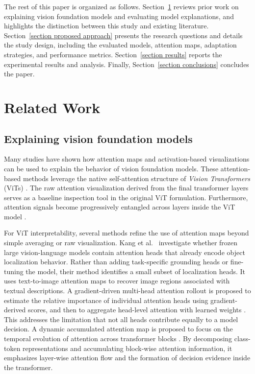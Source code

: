 \documentclass[lineno,pdflatex,sn-mathphys-num]{sn-jnl}%
\theoremstyle{thmstyleone}%
\theoremstyle{thmstyletwo}%
\theoremstyle{thmstylethree}%
\begin{document}
The rest of this paper is organized as follows. Section~\ref{section related works} reviews prior work on explaining vision foundation models and evaluating model explanations, and highlights the distinction between this study and existing literature. Section~\ref{section proposed approach} presents the research questions and details the study design, including the evaluated models, attention maps, adaptation strategies, and performance metrics. Section~\ref{section results} reports the experimental results and analysis. Finally, Section~\ref{section conclusions} concludes the paper.

\section{Related Work} \label{section related works}

\subsection{Explaining vision foundation models}

Many studies have shown how attention maps and activation-based visualizations can be used to explain the behavior of vision foundation models. These attention-based methods leverage the native self-attention structure of \textit{Vision Transformers} (ViTs) \cite{dosovitskiy21vit}. The raw attention visualization derived from the final transformer layers serves as a baseline inspection tool in the original ViT formulation. Furthermore, attention signals become progressively entangled across layers inside the ViT model \cite{Abnar20Rollout}.

For ViT interpretability, several methods refine the use of attention maps beyond simple averaging or raw visualization. Kang et al.~\cite{Kang20259339} investigate whether frozen large vision-language models contain attention heads that already encode object localization behavior. Rather than adding task-specific grounding heads or fine-tuning the model, their method identifies a small subset of localization heads. It uses text-to-image attention maps to recover image regions associated with textual descriptions. A gradient-driven multi-head attention rollout is proposed to estimate the relative importance of individual attention heads using gradient-derived scores, and then to aggregate head-level attention with learned weights \cite{Jo2025582}. This addresses the limitation that not all heads contribute equally to a model decision. A dynamic accumulated attention map is proposed to focus on the temporal evolution of attention across transformer blocks \cite{Liao2025PR}. By decomposing class-token representations and accumulating block-wise attention information, it emphasizes layer-wise attention flow and the formation of decision evidence inside the transformer.
\end{document}
